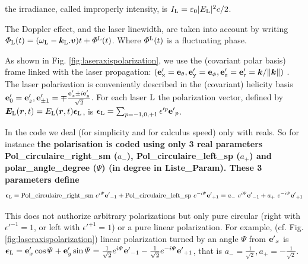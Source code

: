 \documentclass[amsmath,amssymb,nofootinbib]{revtex4-2}
\begin{document}
	 	 the irradiance, called improperly  intensity, is 
	 	$
	 	 I_{\rm L}= \varepsilon_0 |E_{\rm L}|^2 c/2 $.
	 	 
	 	 
	 	 
	 	 The Doppler effect, and the laser linewidth, are taken into account by writing $\Phi_{\rm L} (t) = (\omega_{\rm L}  - {\bm k}_{\rm L}. {\bm v}) t + \Phi^{\rm L} (t)$. Where $\Phi^{\rm L} (t) $ is  a fluctuating phase. 
	 	 
	 	 
	 	As shown in Fig. \ref{fig:laseraxispolarization},
	 	  we   use  the (covariant polar basis) frame linked with the laser propagation:
	 	$({\bf{e}}'_{\rm x} = {\bf{e}}_{\theta} , {\bf{e}}'_{\rm y} = {\bf{e}}_{\phi},  {\bf{e}}'_{\rm z} = {\bf{e}}'_{\rm r} = \bm{k}/\| \bm{k} \|)$ . 
	 	  The  laser polarization is  conveniently described in the (covariant) helicity basis
	 	 $ {\bf e}'_0 = {\bf e}'_z,  {\bf e}'_{\pm 1} =  \mp \frac{{\bf e}'_x \pm
	 	 	i {\bf e}'_y} { \sqrt{2}}$.
	 	 For each laser $\rm L$
	 	 the polarization vector, defined by 
	 	 $ {\bm E}_{\rm L}(\bm r,t) = E_{\rm L}(\bm r,t) {\bm \epsilon}_{\rm L} $, is  $ {\bm \epsilon}_{\rm L} =
	 	 \sum_{p= -1,0,+1} \epsilon'^p 
	 	 {\bf e'}_{p}  $.
	 	 
	 
 In the code we deal (for simplicity and for calculus speed) only with reals. So for instance
	   	 \textbf{the polarisation is  coded using only 3 real parameters  Pol\_circulaire\_right\_sm ($a_{-}$), Pol\_circulaire\_left\_sp ($a_{+}$)  and polar\_angle\_degree  ($\Psi$) (in degree in Liste\_Param). These 3 parameters
 define 
	 \begin{equation}
	 {\bm \epsilon}_{\rm L} = {\rm Pol\_circulaire\_right\_sm} \ e^{i \Psi} {\bf e'}_{-1} + 	 {\rm Pol\_circulaire\_left\_sp} \ e^{-i \Psi}
	 {\bf e'}_{+1} =   a_{-} \ e^{i \Psi} {\bf e'}_{-1} + 	a_{+} \ e^{-i \Psi}
	 {\bf e'}_{+1}  
	 \end{equation}}
	  
	 This does not authorize arbitrary polarizations but only pure circular (right with  $\epsilon'^{-1} =1$, or left with $\epsilon'^{+1}=1$) or
	 a pure linear polarization. For example,   (cf. Fig.
	 \ref{fig:laseraxispolarization}) linear polarization turned by an angle $\Psi$ from $ {\bf e'}_{x} $
is  ${\bm \epsilon}_{\rm L} = {\bf e}'_x \cos\Psi + {\bf e}'_y \sin \Psi = 
	  \frac{1}{\sqrt{2}} e^{i \Psi} {\bf e'}_{-1} - 	 \frac{1}{\sqrt{2}} e^{-i \Psi}
	  {\bf e'}_{+1}  $, that is $a_{-} = \frac{1}{\sqrt{2}}, a_{+}= - 	 \frac{1}{\sqrt{2}}$.	  
	  
\end{document}
